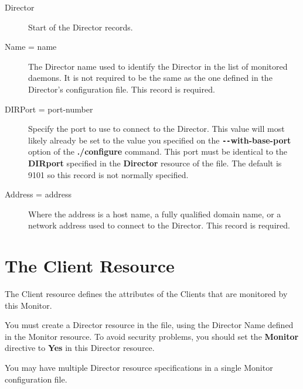 \begin{description}

\item [Director]
   Start of the Director records. 

\item [Name = \lt{}name\gt{}]
   The Director name used to identify  the Director in the list of monitored
daemons. It is not required  to be the same as the one defined in the Director's
configuration file.  This record is required. 

\item [DIRPort = \lt{}port-number\gt{}]
   Specify the port to use to connect  to the Director. This value will most
likely already be set to the value  you specified on the {\bf
\verb:--:with-base-port} option of the  {\bf ./configure} command. This port must be
identical to the  {\bf DIRport} specified in the {\bf Director} resource of
the 
 file.  The
default is 9101 so this record is not normally specified. 

\item [Address = \lt{}address\gt{}]
   Where the address is a host name,  a fully qualified domain name, or a network
address used to connect  to the Director.  This record is required. 
\end{description}

\section{The Client Resource}
\label{ClientResource1}

The Client resource defines the attributes of the Clients that are monitored
by this Monitor.

You must create a Director resource in the 
 file, using the
Director Name defined in the Monitor resource. To avoid security problems, you
should set the {\bf Monitor} directive to {\bf Yes} in this Director resource.


You may have multiple Director resource specifications in a single Monitor
configuration file. 

